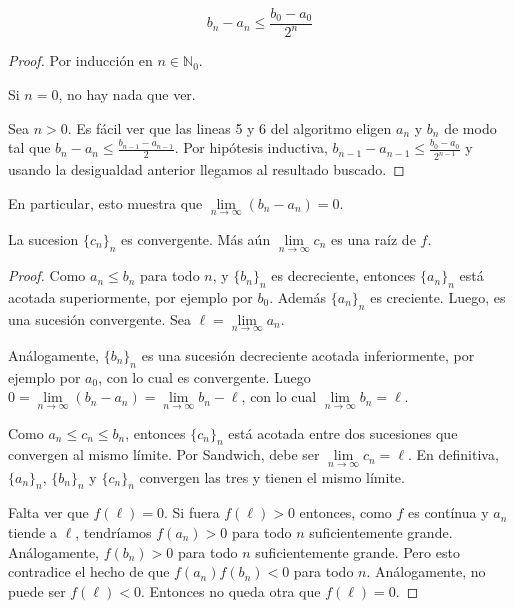 \begin{lema}
\label{lema:sucs}
\[b_n - a_n \leq \frac{b_0 - a_0}{2^n}\]

\begin{proof}
Por inducción en $n \in \mathbb{N}_0$.

Si $n = 0$, no hay nada que ver.

Sea $n > 0$. Es fácil ver que las lineas 5 y 6 del algoritmo eligen $a_n$ y $b_n$ de modo tal que $b_n - a_n \leq \frac{b_{n - 1} - a_{n - 1}}{2}$. Por hipótesis inductiva, $b_{n - 1} - a_{n - 1} \leq \frac{b_0 - a_0}{2^{n - 1}}$ y usando la desigualdad anterior llegamos al resultado buscado.
\end{proof}
\end{lema}

En particular, esto muestra que $\lim\limits_{n \to \infty}(b_n - a_n) = 0$.

\begin{propo}
La sucesion $\{c_n\}_n$ es convergente. Más aún $\lim\limits_{n \to \infty} c_n$ es una raíz de $f$.

\begin{proof}
Como $a_n \leq b_n$ para todo $n$, y $\{b_n\}_n$ es decreciente, entonces $\{a_n\}_n$ está acotada superiormente, por ejemplo por $b_0$. Además $\{a_n\}_n$ es creciente. Luego, es una sucesión convergente. Sea $\ell = \lim\limits_{n \to \infty} a_n$.

Análogamente, $\{b_n\}_n$ es una sucesión decreciente acotada inferiormente, por ejemplo por $a_0$, con lo cual es convergente. Luego $0 = \lim\limits_{n \to \infty} (b_n - a_n) = \lim\limits_{n \to \infty} b_n - \ell$, con lo cual $\lim\limits_{n \to \infty} b_n = \ell$.

Como $a_n \leq c_n \leq b_n$, entonces $\{c_n\}_n$ está acotada entre dos sucesiones que convergen al mismo límite. Por Sandwich, debe ser $\lim\limits_{n \to \infty} c_n = \ell$. En definitiva, $\{a_n\}_n$, $\{b_n\}_n$ y $\{c_n\}_n$ convergen las tres y tienen el mismo límite.

Falta ver que $f(\ell) = 0$. Si fuera $f(\ell) > 0$ entonces, como $f$ es contínua y $a_n$ tiende a $\ell$, tendríamos $f(a_n) > 0$ para todo $n$ suficientemente grande. Análogamente, $f(b_n) > 0$ para todo $n$ suficientemente grande. Pero esto contradice el hecho de que $f(a_n)f(b_n) < 0$ para todo $n$. Análogamente, no puede ser $f(\ell) < 0$. Entonces no queda otra que $f(\ell) = 0$.

\end{proof}
\end{propo}

